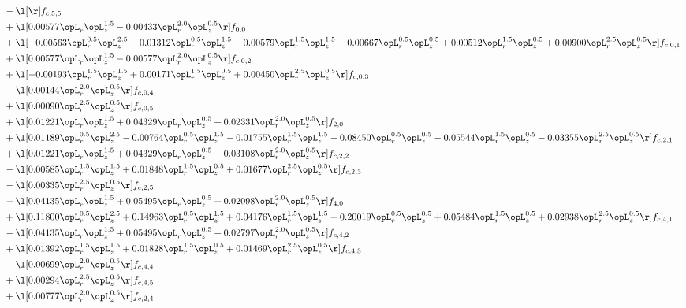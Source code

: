 \begin{alignat}{2}
& - \l[  \r] f_{c,5,5} \nonumber \\ 
& + \l[  0.00577 \opL_r \opL_z^{1.5}   -0.00433 \opL_r^{2.0} \opL_z^{0.5}  \r] f_{0,0} \nonumber \\ 
& + \l[  -0.00563 \opL_r^{0.5} \opL_z^{2.5}   -0.01312 \opL_r^{0.5} \opL_z^{1.5}   -0.00579 \opL_r^{1.5} \opL_z^{1.5}   -0.00667 \opL_r^{0.5} \opL_z^{0.5} +  0.00512 \opL_r^{1.5} \opL_z^{0.5} +  0.00900 \opL_r^{2.5} \opL_z^{0.5}  \r] f_{c,0,1} \nonumber \\ 
& + \l[  0.00577 \opL_r \opL_z^{1.5}   -0.00577 \opL_r^{2.0} \opL_z^{0.5}  \r] f_{c,0,2} \nonumber \\ 
& + \l[  -0.00193 \opL_r^{1.5} \opL_z^{1.5} +  0.00171 \opL_r^{1.5} \opL_z^{0.5} +  0.00450 \opL_r^{2.5} \opL_z^{0.5}  \r] f_{c,0,3} \nonumber \\ 
& - \l[  0.00144 \opL_r^{2.0} \opL_z^{0.5}  \r] f_{c,0,4} \nonumber \\ 
& + \l[  0.00090 \opL_r^{2.5} \opL_z^{0.5}  \r] f_{c,0,5} \nonumber \\ 
& + \l[  0.01221 \opL_r \opL_z^{1.5} +  0.04329 \opL_r \opL_z^{0.5} +  0.02331 \opL_r^{2.0} \opL_z^{0.5}  \r] f_{2,0} \nonumber \\ 
& + \l[  0.01189 \opL_r^{0.5} \opL_z^{2.5}   -0.00764 \opL_r^{0.5} \opL_z^{1.5}   -0.01755 \opL_r^{1.5} \opL_z^{1.5}   -0.08450 \opL_r^{0.5} \opL_z^{0.5}   -0.05544 \opL_r^{1.5} \opL_z^{0.5}   -0.03355 \opL_r^{2.5} \opL_z^{0.5}  \r] f_{c,2,1} \nonumber \\ 
& + \l[  0.01221 \opL_r \opL_z^{1.5} +  0.04329 \opL_r \opL_z^{0.5} +  0.03108 \opL_r^{2.0} \opL_z^{0.5}  \r] f_{c,2,2} \nonumber \\ 
& - \l[  0.00585 \opL_r^{1.5} \opL_z^{1.5} +  0.01848 \opL_r^{1.5} \opL_z^{0.5} +  0.01677 \opL_r^{2.5} \opL_z^{0.5}  \r] f_{c,2,3} \nonumber \\ 
& - \l[  0.00335 \opL_r^{2.5} \opL_z^{0.5}  \r] f_{c,2,5} \nonumber \\ 
& - \l[  0.04135 \opL_r \opL_z^{1.5} +  0.05495 \opL_r \opL_z^{0.5} +  0.02098 \opL_r^{2.0} \opL_z^{0.5}  \r] f_{4,0} \nonumber \\ 
& + \l[  0.11800 \opL_r^{0.5} \opL_z^{2.5} +  0.14963 \opL_r^{0.5} \opL_z^{1.5} +  0.04176 \opL_r^{1.5} \opL_z^{1.5} +  0.20019 \opL_r^{0.5} \opL_z^{0.5} +  0.05484 \opL_r^{1.5} \opL_z^{0.5} +  0.02938 \opL_r^{2.5} \opL_z^{0.5}  \r] f_{c,4,1} \nonumber \\ 
& - \l[  0.04135 \opL_r \opL_z^{1.5} +  0.05495 \opL_r \opL_z^{0.5} +  0.02797 \opL_r^{2.0} \opL_z^{0.5}  \r] f_{c,4,2} \nonumber \\ 
& + \l[  0.01392 \opL_r^{1.5} \opL_z^{1.5} +  0.01828 \opL_r^{1.5} \opL_z^{0.5} +  0.01469 \opL_r^{2.5} \opL_z^{0.5}  \r] f_{c,4,3} \nonumber \\ 
& - \l[  0.00699 \opL_r^{2.0} \opL_z^{0.5}  \r] f_{c,4,4} \nonumber \\ 
& + \l[  0.00294 \opL_r^{2.5} \opL_z^{0.5}  \r] f_{c,4,5} \nonumber \\ 
& + \l[  0.00777 \opL_r^{2.0} \opL_z^{0.5}  \r] f_{c,2,4} \nonumber \\ 
\end{alignat} 


